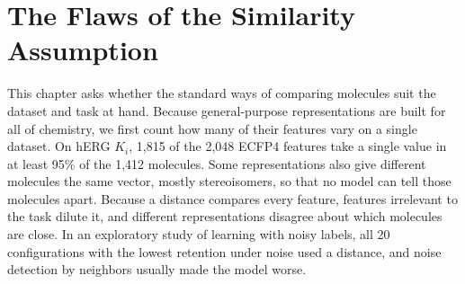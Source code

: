 \chapter{The Flaws of the Similarity Assumption}\label{chap:flaws}

This chapter asks whether the standard ways of comparing molecules suit the dataset and task at hand. Because general-purpose representations are built for all of chemistry, we first count how many of their features vary on a single dataset. On hERG $K_i$, 1,815 of the 2,048 ECFP4 features take a single value in at least 95\% of the 1,412 molecules. Some representations also give different molecules the same vector, mostly stereoisomers, so that no model can tell those molecules apart. Because a distance compares every feature, features irrelevant to the task dilute it, and different representations disagree about which molecules are close. In an exploratory study of learning with noisy labels, all 20 configurations with the lowest retention under noise used a distance, and noise detection by neighbors usually made the model worse.



